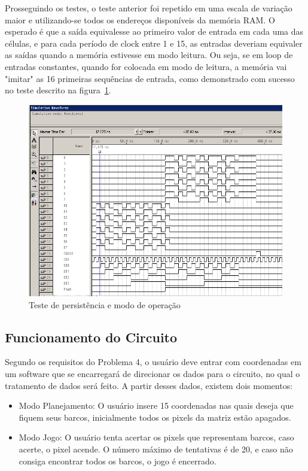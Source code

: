 \documentclass[12pt]{article}
\begin{document}
Prosseguindo os testes, o teste anterior foi repetido em uma escala de variação maior e utilizando-se todos os endereços disponíveis da memória RAM. O esperado é que a saída equivalesse ao primeiro valor de entrada em cada uma das células, e para cada período de clock entre 1 e 15, as entradas deveriam equivaler as saídas quando a memória estivesse em modo leitura. Ou seja, se em loop de entradas constantes, quando for colocada em modo de leitura, a memória vai "imitar" as 16 primeiras sequências de entrada, como demonstrado com sucesso no teste descrito na figura~\ref{fig:ramtest2}.

\begin{figure}[!htbp]
\centering
\includegraphics[width=1\textwidth]{img/p4/testram2.png}
\caption{Teste de persistência e modo de operação}
\label{fig:ramtest2}
\end{figure}

\subsection{Funcionamento do Circuito}
Segundo os requisitos do Problema 4, o usuário deve entrar com coordenadas em um software que se encarregará de direcionar os dados para o circuito, no qual o tratamento de dados será feito. A partir desses dados, existem dois momentos:

\begin{itemize}
\item Modo Planejamento: O usuário insere 15 coordenadas nas quais deseja que fiquem seus barcos, inicialmente todos os pixels da matriz estão apagados.
\item Modo Jogo: O usuário tenta acertar os pixels que representam barcos, caso acerte, o pixel acende. O número máximo de tentativas é de 20, e caso não consiga encontrar todos os barcos, o jogo é encerrado.
\end{itemize}
\end{document}
